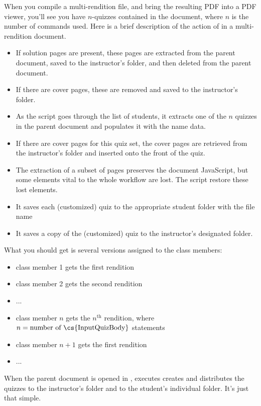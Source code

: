 \documentclass{article}
\begin{document}
When you compile a multi-rendition file, and bring the resulting PDF into a
PDF viewer, you'll see you have $n$-quizzes contained in the document, where
$n$ is the number of  commands used. Here is a brief
description of the action of  in a multi-rendition document.
\begin{itemize}
  \item If solution pages are present, these pages are extracted from the
      parent document, saved to the instructor's folder, and then
      deleted from the parent document.
  \item If there are cover pages, these are removed and saved to the
      instructor's folder.
  \item As the script goes through the list of students, it extracts one of
      the $n$ quizzes in the parent document and populates it with the name
      data.
  \item If there are cover pages for this quiz set, the cover pages are
      retrieved from the instructor's folder and inserted onto the front of
      the quiz.
  \item The extraction of a subset of pages preserves the document JavaScript,
      but some elements vital to the whole workflow are lost. The script
      restore these lost elements.
  \item It saves each (customized) quiz to the appropriate student folder
      with the file name 
  \item It saves a copy of the (customized) quiz to the instructor's
      designated folder.
\end{itemize}
What you should get is several versions assigned to the class members:
\begin{itemize}
  \item class member 1 gets the first rendition
  \item class member 2 gets the second rendition
  \item[]...
  \item class member $n$ gets the $n^{\text{th}}$ rendition, where $n = \text{number of \cs{InputQuizBody}}$ statements
  \item class member $n+1$ gets the first rendition
  \item[]...
\end{itemize}
When the parent document is opened in , 
executes creates and distributes the quizzes to the instructor's folder and
to the student's individual folder. It's just that simple.
\end{document}
